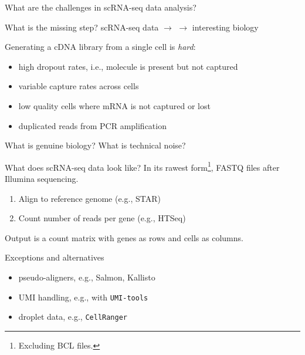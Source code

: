 \documentclass{beamer}
\begin{document}
\begin{frame}{What are the challenges in scRNA-seq data analysis?}
    \begin{alertblock}{What is the missing step?}
    scRNA-seq data $\to$  $\to$ interesting biology \\[0.1in]
\end{alertblock}
    \pause
    Generating a cDNA library from a single cell is \textit{hard}:\\[0.1em]
    \begin{itemize}
        \setlength\itemsep{0.5em}
        \item high dropout rates, i.e., molecule is present but not captured
        \item variable capture rates across cells
        \item low quality cells where mRNA is not captured or lost
        \item duplicated reads from PCR amplification 
    \end{itemize}
    \vspace{0.1in}
    What is genuine biology? What is technical noise? 
\end{frame}

\begin{frame}{What does scRNA-seq data look like?}
In its rawest form\footnote{Excluding BCL files.}, FASTQ files after Illumina sequencing.
\begin{enumerate}
\item Align to reference genome (e.g., STAR)
\item Count number of reads per gene (e.g., HTSeq)
\end{enumerate}
Output is a count matrix with genes as rows and cells as columns. 

\begin{exampleblock}{Exceptions and alternatives}
\begin{itemize}
    \item pseudo-aligners, e.g., Salmon, Kallisto
    \item UMI handling, e.g., with \texttt{UMI-tools}
    \item droplet data, e.g., \texttt{CellRanger}
\end{itemize}
\end{exampleblock}
\end{frame}
\end{document}
